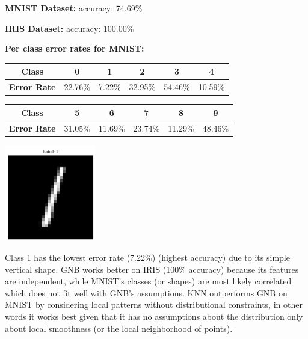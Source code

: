 \documentclass[12pt]{article}
\begin{document}
\begin{enumerate}
        \textbf{MNIST Dataset:} accuracy: 74.69\%

        \textbf{IRIS Dataset:} accuracy: 100.00\%

        \textbf{Per class error rates for MNIST:}
        \begin{center}
        \begin{tabular}{|c|c|c|c|c|c|}
        \hline
        \textbf{Class} & 0 & 1 & 2 & 3 & 4 \\
        \hline
        \textbf{Error Rate} & 22.76\% & 7.22\% & 32.95\% & 54.46\% & 10.59\% \\
        \hline
        \end{tabular}
        \end{center}

        \begin{center}
        \begin{tabular}{|c|c|c|c|c|c|}
        \hline
        \textbf{Class} & 5 & 6 & 7 & 8 & 9 \\
        \hline
        \textbf{Error Rate} & 31.05\% & 11.69\% & 23.74\% & 11.29\% & 48.46\% \\
        \hline
        \end{tabular}
        \end{center}
        
        \begin{center}
        \includegraphics[width=0.3\textwidth]{class_1.png}
        \end{center}

        Class 1 has the lowest error rate (7.22\%) (highest accuracy) due to its simple vertical shape. GNB works better on IRIS (100\% accuracy) because its features are independent, while MNIST's classes (or shapes) are most likely correlated which does not fit well with GNB's assumptions. KNN outperforms GNB on MNIST by considering local patterns without distributional constraints, in other words it works best given that it has no assumptions about the distribution only about local smoothness (or the local neighborhood of points).

    \end{enumerate}
\end{document}
